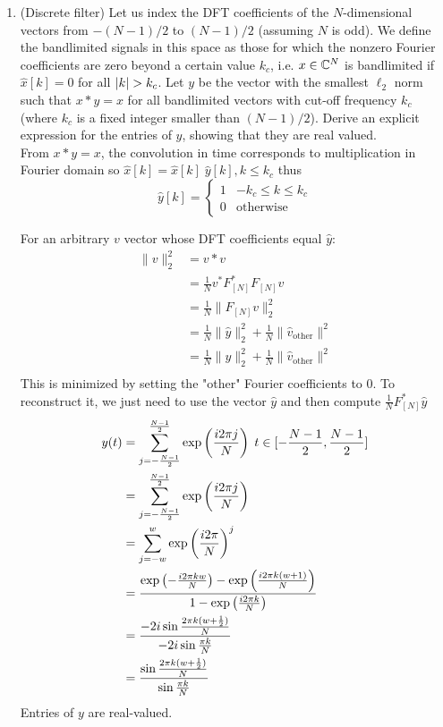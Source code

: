 \documentclass[12pt,twoside]{article}
\begin{document}
\begin{enumerate}
  \newpage
 \item (Discrete filter) Let us index the DFT coefficients of the $N$-dimensional vectors from $-(N-1)/2$ to $(N-1)/2$ (assuming $N$ is odd). We define the bandlimited signals in this space as those for which the nonzero Fourier coefficients are zero beyond a certain value $k_c$, i.e. $x \in \mathbb{C}^{N}$ is bandlimited if $\hat{x}[k]=0$ for all $\lvert k\rvert>k_c$. Let $y$ be the vector with the smallest $\ell_2$ norm such that $x \ast y = x$ for all bandlimited vectors with cut-off frequency $k_c$ (where $k_c$ is a fixed integer smaller than $(N-1)/2$). Derive an explicit expression for the entries of $y$, showing that they are real valued.\\
 
From  $x \ast y = x$, the convolution in time corresponds to multiplication in  Fourier domain so $\hat{x}[k] = \hat{x}[k] \; \hat{y}[k], k \le k_c$ thus
\begin{equation}
  \hat{y}[k] =
    \begin{cases}
      1 & -k_c \le k \le k_c\\
      0 & \text{otherwise}
    \end{cases}       
\end{equation}

For an arbitrary $v$ vector whose DFT coefficients equal $\hat{y}$:
 \begin{align*}
 	\|v\|_2^2	&=	v*v \\
			&= \frac{1}{N}	v^* F_{[N]}^* F_{[N]} v \\ 
			&= 	 \frac{1}{N} \|F_{[N]} v\|_2^2 \\
			&= 	 \frac{1}{N} \|\hat{y}\|_2^2 +  \frac{1}{N} \|\hat{v}_{\text{other}}\|^2 \\
			&= 	 \frac{1}{N} \|y\|_2^2 +  \frac{1}{N} \|\hat{v}_{\text{other}}\|^2 \\
 \end{align*}
 This is minimized by setting the "other" Fourier coefficients to $0$. To reconstruct it, we just need to use the vector $\hat{y}$ and then compute $ \frac{1}{N}  F_{[N]}^* \hat{y}$
 \begin{align*}
 	y(t)		&= \sum_{j=-\frac{N-1}{2}}^{\frac{N-1}{2}}	\exp\left( \frac{i2 \pi j}{N} \right)  \; t \in [-\frac{N-1}{2}, \frac{N-1}{2}] \\
			&= \sum_{j=-\frac{N-1}{2}}^{\frac{N-1}{2}}	\exp\left( \frac{i2 \pi j}{N} \right) \\
			&= \sum_{j=-w}^w \exp\left( \frac{i2 \pi}{N} \right)^j \\
			&=	\frac{ \exp\left( -\frac{i2 \pi k w}{N} \right) -  \exp\left( \frac{i2 \pi k (w+1)}{N} \right) } {1 -   \exp\left( \frac{i2 \pi k}{N} \right)} \\ 
			&= \frac{ -2 i \sin{\frac{2 \pi k (w + \frac{1}{2})}  {N} } } {-2 i \sin{\frac{\pi k}{N}} } \\
			&=  \frac{\sin{\frac{2 \pi k (w + \frac{1}{2})}  {N} } } {\sin{\frac{\pi k}{N}} } \\
 \end{align*}
 Entries of $y$ are real-valued.
 

\end{enumerate}
\end{document}
